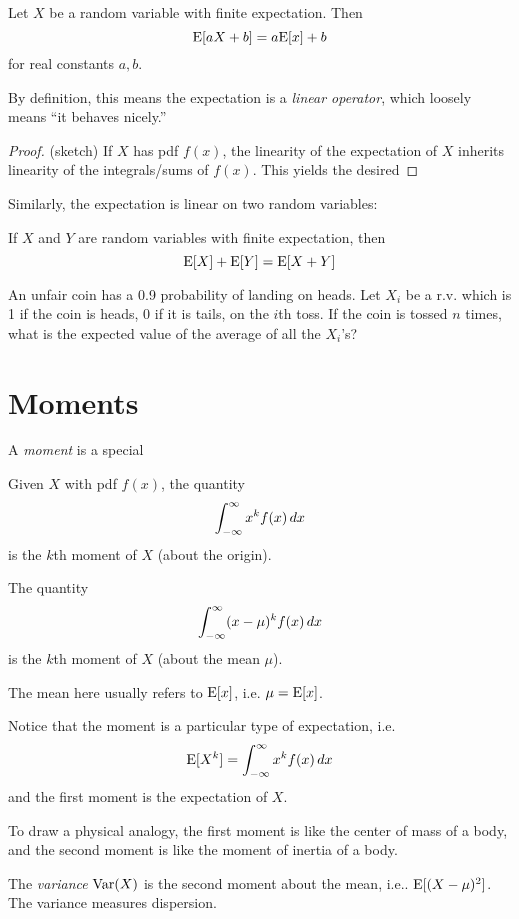 \documentclass[../main.tex]{subfiles}
\begin{document}
\begin{theorem}[Linearity]
Let $X$ be a random variable with finite expectation. Then 
$$\mathrm E[aX+b] = a\mathrm E[x]+b$$
for real constants $a,b$.
\end{theorem}
By definition, this means the expectation is a \textit{linear operator}, which loosely means ``it behaves nicely.''
\begin{proof}
(sketch) If $X$ has pdf $f(x)$, the linearity of the expectation of $X$ inherits linearity of the integrals/sums of $f(x)$. This yields the desired
\end{proof}
Similarly, the expectation is linear on two random variables: 
\begin{theorem}
If $X$ and $Y$ are random variables with finite expectation, then 
\[
    \mathrm E[X] + \mathrm E[Y] = \mathrm E[X+Y]
\]
\end{theorem}
\begin{example}
    An unfair coin has a 0.9 probability of landing on heads. Let $X_i$ be a r.v. which is 1 if the coin is heads, 0 if it is tails, on the $i$th toss. If the coin is tossed $n$ times, what is the expected value of the average of all the $X_i$'s?
\end{example}

\section{Moments}
A \textit{moment} is a special 
\begin{definition}
Given $X$ with pdf $f(x)$, the quantity
\[
    \int_{-\infty}^\infty x^k f(x) \,dx 
\]
is the $k$th moment of $X$ (about the origin).
\end{definition}
\begin{definition}
The quantity
\[
    \int_{-\infty}^\infty (x-\mu)^k f(x) \,dx 
\]
is the $k$th moment of $X$ (about the mean $\mu$).
\end{definition}
The mean here usually refers to $\mathrm E[x]$, i.e. $\mu = \mathrm E[x]$.

Notice that the moment is a particular type of expectation, i.e. 
\[
    \mathrm E[X^k] =  \int_{-\infty}^\infty x^k f(x) \,dx 
\]
and the first moment is the expectation of $X$. 

To draw a physical analogy, the first moment is like the center of mass of a body, and the second moment is like the moment of inertia of a body.
\begin{definition}
The \textit{variance} $\mathrm{Var}(X)$ is the second moment about the mean, i.e..  $\mathrm E[(X-\mu)^2]$. The variance measures dispersion.
\end{definition}
\end{document}
